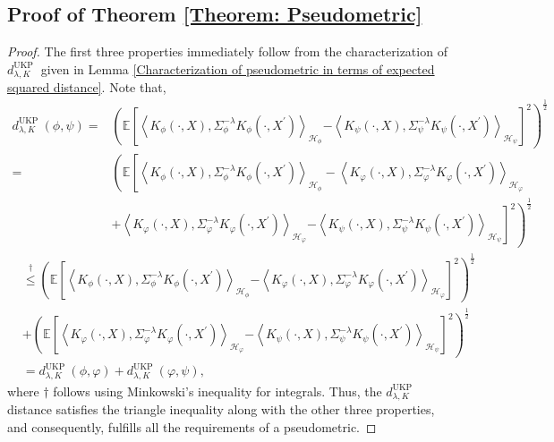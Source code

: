 \documentclass[11pt]{article}
\newcommand{\E}{\mathbb{E}}
\newcommand{\repone}{\phi}
\newcommand{\reptwo}{\psi}
\newcommand{\repthree}{\varphi}
\newcommand{\Hone}{\mathcal{H}_{\phi}}
\newcommand{\Htwo}{\mathcal{H}_{\psi}}
\newcommand{\Hthree}{\mathcal{H}_{\varphi}}
\newcommand{\inprod}[1]{\left \langle #1 \right\rangle}
\newcommand{\metricstname}{UKP }
\theoremstyle{plain}
\begin{document}
\subsection{Proof of Theorem \ref{Theorem: Pseudometric}}\label{Proof of Theorem 1}

\begin{proof}
    The first three properties immediately follow from the characterization of $d_{\lambda,K}^{\text{\metricstname}}$ given in Lemma \ref{Characterization of pseudometric in terms of expected squared distance}. Note that,
    \[
    \begin{aligned}
        d_{\lambda,K}^{\text{\metricstname}}(\repone,\reptwo)
        =& \left(\E  \left[\inprod{K_{\repone}(\cdot,X),\Sigma_{\repone}^{-\lambda}K_{\repone}(\cdot,X^{\prime})}_{\Hone} \right.\right. \left.\left. -\inprod{K_{\reptwo}(\cdot,X),\Sigma_{\reptwo}^{-\lambda}K_{\reptwo}(\cdot,X^{\prime})}_{\Htwo}\right]^{2}\right)^{\frac{1}{2}}\\
        =& \left(\E  \left[\inprod{K_{\repone}(\cdot,X),\Sigma_{\repone}^{-\lambda}K_{\repone}(\cdot,X^{\prime})}_{\Hone} \right.\right.  -\inprod{K_{\repthree}(\cdot,X),\Sigma_{\repthree}^{-\lambda}K_{\repthree}(\cdot,X^{\prime})}_{\Hthree}\\
        &+\inprod{K_{\repthree}(\cdot,X),\Sigma_{\repthree}^{-\lambda}K_{\repthree}(\cdot,X^{\prime})}_{\Hthree}\left.\left. -\inprod{K_{\reptwo}(\cdot,X),\Sigma_{\reptwo}^{-\lambda}K_{\reptwo}(\cdot,X^{\prime})}_{\Htwo}\right]^{2}\right)^{\frac{1}{2}}
        \end{aligned}
        \]
        \[
        \begin{aligned}
        &\overset{\dagger}{\leq} \left(\E  \left[\inprod{K_{\repone}(\cdot,X),\Sigma_{\repone}^{-\lambda}K_{\repone}(\cdot,X^{\prime})}_{\Hone} \right.\right. \left.\left. -\inprod{K_{\repthree}(\cdot,X),\Sigma_{\repthree}^{-\lambda}K_{\repthree}(\cdot,X^{\prime})}_{\Hthree}\right]^{2}\right)^{\frac{1}{2}}\\
        &+ \left(\E  \left[\inprod{K_{\repthree}(\cdot,X),\Sigma_{\repthree}^{-\lambda}K_{\repthree}(\cdot,X^{\prime})}_{\Hthree} \right.\right. \left.\left. -\inprod{K_{\reptwo}(\cdot,X),\Sigma_{\reptwo}^{-\lambda}K_{\reptwo}(\cdot,X^{\prime})}_{\Htwo}\right]^{2}\right)^{\frac{1}{2}}\\
        &=  d_{\lambda,K}^{\text{\metricstname}}(\repone,\repthree) + d_{\lambda,K}^{\text{\metricstname}}(\repthree,\reptwo),
    \end{aligned}
    \]
    where $\dagger$ follows using Minkowski's inequality for integrals. Thus, the $d_{\lambda,K}^{\text{\metricstname}}$ distance satisfies the triangle inequality along with the other three properties, and consequently, fulfills all the requirements of a pseudometric.
\end{proof}
\end{document}
